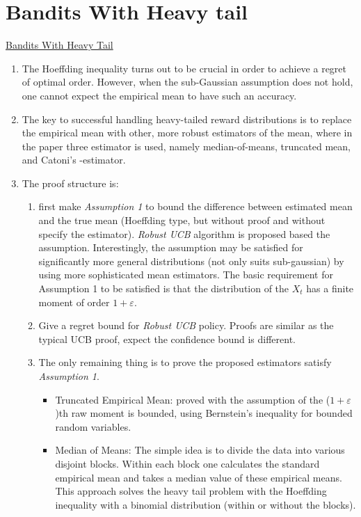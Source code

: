 \documentclass{article}
\begin{document}
\section{Bandits With Heavy tail}
\href{http://ieeexplore.ieee.org/document/6576820/}{Bandits With Heavy Tail}
\begin{enumerate}
    \item The Hoeffding inequality turns out to be crucial in
order to achieve a regret of optimal order. However, when the
sub-Gaussian assumption does not hold, one cannot expect the
empirical mean to have such an accuracy.
    \item The key to successful handling heavy-tailed reward distributions is to replace the empirical mean with other, more robust estimators of the mean, where in the paper three estimator is used, namely median-of-means, truncated mean, and Catoni’s -estimator.
    \item The proof structure is:
        \begin{enumerate}
            \item first make \textit{Assumption 1} to bound the difference between estimated mean and the true mean (Hoeffding type, but without proof and without specify the estimator). \textit{Robust UCB} algorithm is proposed based the assumption. Interestingly, the assumption may be satisfied for significantly more general distributions (not only suits sub-gaussian) by using more sophisticated mean estimators. The basic requirement for Assumption 1 to be satisfied is that the distribution of the $X_t$ has a finite moment of order $1 + \varepsilon$.
            \item Give a regret bound for \textit{Robust UCB} policy. Proofs are similar as the typical UCB proof, expect the confidence bound is different. 
            \item The only remaining thing is to prove the proposed estimators satisfy \textit{Assumption 1}. 
                \begin{itemize}
                    \item Truncated Empirical Mean: proved with the assumption of the ($1+ \varepsilon$)th raw moment is bounded, using Bernstein’s inequality for bounded random variables.
                    \item Median of Means: The simple idea is to divide the data into various disjoint blocks. Within each block one calculates the standard empirical mean and takes a median value of these empirical means. This approach solves the heavy tail problem with the Hoeffding inequality with a binomial distribution (within or without the blocks). 
                \end{itemize}
        \end{enumerate}
\end{enumerate}
\end{document}
